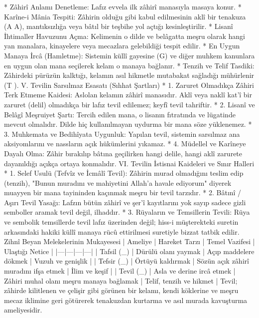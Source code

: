 \documentclass[11pt,a4paper]{article}
\begin{document}
 * Zâhirî Anlamı Denetleme: Lafız evvela ilk zâhirî manasıyla masaya konur.
 * Karîne-i Mânia Tespiti: Zâhirin olduğu gibi kabul edilmesinin aklî bir tenakuza (A \wedge \neg A), mantıksızlığa veya bâtıl bir teşbihe yol açtığı kesinleştirilir.
 * Lisanî İhtimaller Havuzunu Açma: Kelimenin o dilde ve belâgatta meşru olarak hangi yan manalara, kinayelere veya mecazlara gelebildiği tespit edilir.
 * En Uygun Manaya İrcâ (Hamletme): Sistemin küllî gayesine (G) ve diğer muhkem kanunlara en uygun olan mana seçilerek kelam o manaya bağlanır.
 * Tenzih ve Telif Tasdiki: Zâhirdeki pürüzün kalktığı, kelamın asıl hikmetle mutabakat sağladığı mühürlenir (T ).
V. Tevilin Sarsılmaz Esasatı (Sıhhat Şartları)
 * 1. Zaruret Olmadıkça Zâhiri Terk Etmeme Kaidesi:
   Aslolan kelamın zâhirî manasıdır. Aklî veya naklî kat'î bir zaruret (delil) olmadıkça bir lafız tevil edilemez; keyfî tevil tahriftir.
 * 2. Lisanî ve Belâgî Meşruiyet Şartı:
   Tercih edilen mana, o lisanın fıtratında ve lügatinde mevcut olmalıdır. Dilde hiç kullanılmayan uydurma bir mana söze yüklenemez.
 * 3. Muhkemata ve Bedihîyata Uygunluk:
   Yapılan tevil, sistemin sarsılmaz ana aksiyomlarını ve nassların açık hükümlerini yıkamaz.
 * 4. Müdellel ve Karîneye Dayalı Olma:
   Zâhir bırakılıp bâtına geçilirken hangi delile, hangi aklî zarurete dayanıldığı açıkça ortaya konmalıdır.
VI. Tevilin İstisnai Kaideleri ve Sınır Halleri
 * 1. Selef Usulü (Tefvîz ve İcmâlî Tevil):
   Zâhirin murad olmadığını teslim edip (tenzih), "Bunun muradını ve mahiyetini Allah'a havale ediyorum" diyerek muayyen bir mana tayininden kaçınmak meşru bir tevil tarzıdır.
 * 2. Bâtınî / Aşırı Tevil Yasağı:
   Lafzın bütün zâhirî ve şer'î kayıtlarını yok sayıp sadece gizli semboller aramak tevil değil, ilhaddır.
 * 3. Rüyaların ve Temsillerin Tevili:
   Rüya ve sembolik temsillerde tevil lafız üzerinden değil; hiss-i müşterekteki suretin arkasındaki hakiki küllî manaya rücû ettirilmesi suretiyle bizzat tatbik edilir.
Zihnî Beyan Melekelerinin Mukayesesi
| Ameliye | Hareket Tarzı | Temel Vazifesi | Ulaştığı Netice |
|---|---|---|---|
| 
Tafsil (_{}) | Dürülü olanı yaymak | Açıp maddelere dökmek | Vuzuh ve genişlik |
| Tefsir (_{}) | Örtüyü kaldırmak | Sözün açık zâhirî muradını ifşa etmek | İlim ve keşif |
| Tevil (_{}) | Asla ve derine ircâ etmek | Zâhiri muhal olanı meşru manaya bağlamak | Telif, tenzih ve hikmet |
Tevil; zâhirde kilitlenen ve çelişir gibi görünen bir kelamı, kendi köklerine ve meşru mecaz iklimine geri götürerek tenakuzdan kurtarma ve asıl murada kavuşturma ameliyesidir.
\end{document}
